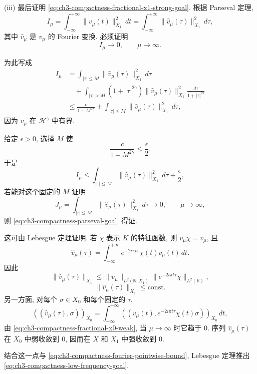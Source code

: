 \begin{Proof}
(iii) 最后证明 \eqref{eq:ch3-compactness-fractional-x1-strong-goal}. 根据 Parseval 定理,
\begin{equation}
I_\mu=\int_{-\infty}^{+\infty}\lVert v_\mu(t)\rVert_{X_1}^2\,dt
=\int_{-\infty}^{+\infty}\lVert\widehat v_\mu(\tau)\rVert_{X_1}^2\,d\tau,
\label{eq:ch3-compactness-parseval-integral}
\end{equation}
其中 $\widehat v_\mu$ 是 $v_\mu$ 的 Fourier 变换. 必须证明
\begin{equation}
I_\mu\longrightarrow0,
\qquad\mu\to\infty.
\label{eq:ch3-compactness-parseval-goal}
\end{equation}

\hypertarget{chapter-03-page-202}{}
为此写成
\[
\begin{aligned}
I_\mu
&=\int_{|\tau|\leq M}\lVert\widehat v_\mu(\tau)\rVert_{X_1}^2\,d\tau\\
&\quad+\int_{|\tau|>M}(1+|\tau|^{2\gamma})
\lVert\widehat v_\mu(\tau)\rVert_{X_1}^2
\frac{d\tau}{1+|\tau|^{2\gamma}}\\
&\leq\frac{c}{1+M^{2\gamma}}
+\int_{|\tau|\leq M}\lVert\widehat v_\mu(\tau)\rVert_{X_1}^2\,d\tau,
\end{aligned}
\]
因为 $v_\mu$ 在 $\mathcal H^\gamma$ 中有界.

给定 $\epsilon>0$, 选择 $M$ 使
\[
\frac{c}{1+M^{2\gamma}}\leq\frac\epsilon2.
\]
于是
\[
I_\mu\leq\int_{|\tau|\leq M}\lVert\widehat v_\mu(\tau)\rVert_{X_1}^2\,d\tau
+\frac\epsilon2,
\]
若能对这个固定的 $M$ 证明
\begin{equation}
J_\mu=\int_{|\tau|\leq M}\lVert\widehat v_\mu(\tau)\rVert_{X_1}^2\,d\tau
\longrightarrow0,
\qquad\mu\to\infty,
\label{eq:ch3-compactness-low-frequency-goal}
\end{equation}
则 \eqref{eq:ch3-compactness-parseval-goal} 得证.

这可由 Lebesgue 定理证明. 若 $\chi$ 表示 $K$ 的特征函数, 则 $v_\mu\chi=v_\mu$, 且
\[
\widehat v_\mu(\tau)
=\int_{-\infty}^{+\infty}e^{-2i\pi t\tau}\chi(t)v_\mu(t)\,dt.
\]
因此
\[
\lVert\widehat v_\mu(\tau)\rVert_{X_1}
\leq\lVert v_\mu\rVert_{L^2(\mathbb R;X_1)}
\lVert e^{-2i\pi t\tau}\chi\rVert_{L^2(\mathbb R)},
\]
\begin{equation}
\lVert\widehat v_\mu(\tau)\rVert_{X_1}\leq\mathrm{const}.
\label{eq:ch3-compactness-fourier-pointwise-bound}
\end{equation}
另一方面, 对每个 $\sigma\in X_0$ 和每个固定的 $\tau$,
\[
((\widehat v_\mu(\tau),\sigma))_{X_0}
=\int_{-\infty}^{+\infty}
((v_\mu(t),e^{-2i\pi t\tau}\chi(t)\sigma))_{X_0}\,dt,
\]
由 \eqref{eq:ch3-compactness-fractional-x0-weak}, 当 $\mu\to\infty$ 时它趋于 $0$. 序列 $\widehat v_\mu(\tau)$ 在 $X_0$ 中弱收敛到 $0$, 因而在 $X$ 和 $X_1$ 中强收敛到 $0$.

结合这一点与 \eqref{eq:ch3-compactness-fourier-pointwise-bound}, Lebesgue 定理推出 \eqref{eq:ch3-compactness-low-frequency-goal}.
\end{Proof}

